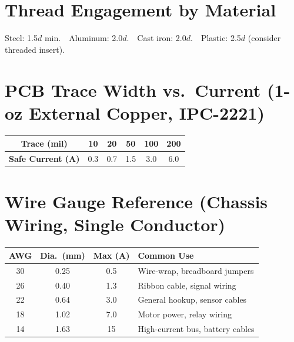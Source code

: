 \documentclass[11pt,letterpaper,twoside,openany]{book}
\begin{document}
\section*{Thread Engagement by Material}
Steel: 1.5$d$ min.\ \ Aluminum: 2.0$d$.\ \ Cast iron: 2.0$d$.\ \ Plastic: 2.5$d$ (consider threaded insert).

\section*{PCB Trace Width vs.\ Current (1-oz External Copper, IPC-2221)}
\begin{table}[htbp]\centering\small
\begin{tabularx}{\textwidth}{c c c c c c}
\toprule
\textbf{Trace (mil)} & 10 & 20 & 50 & 100 & 200 \\
\midrule
\textbf{Safe Current (A)} & 0.3 & 0.7 & 1.5 & 3.0 & 6.0 \\
\bottomrule
\end{tabularx}
\end{table}

\section*{Wire Gauge Reference (Chassis Wiring, Single Conductor)}
\begin{table}[htbp]\centering\small
\begin{tabularx}{\textwidth}{c c c X}
\toprule
\textbf{AWG} & \textbf{Dia.\ (mm)} & \textbf{Max (A)} & \textbf{Common Use} \\
\midrule
30 & 0.25 & 0.5 & Wire-wrap, breadboard jumpers \\
26 & 0.40 & 1.3 & Ribbon cable, signal wiring \\
22 & 0.64 & 3.0 & General hookup, sensor cables \\
18 & 1.02 & 7.0 & Motor power, relay wiring \\
14 & 1.63 & 15 & High-current bus, battery cables \\
\bottomrule
\end{tabularx}
\end{table}
\end{document}
